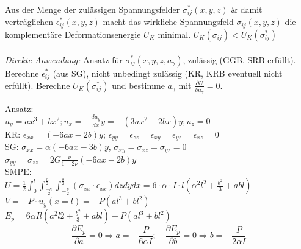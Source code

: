 \documentclass[a4paper,10pt]{article}
\begin{document}
\begin{multicols*}{3}
            Aus der Menge der zulässigen Spannungsfelder $\sigma_{ij}^*(x,y,z)$ \& damit verträglichen $\epsilon_{ij}^*(x,y,z)$ macht das wirkliche Spannungsfeld $\sigma_{ij}(x,y,z)$ die komplementäre Deformationsenergie $U_K$ minimal. $U_K(\sigma_{ij}) < U_K(\sigma_{ij}^*)$\\\\
            \textit{Direkte Anwendung:} Ansatz für $\sigma_{ij}^*(x,y,z,a_\gamma)$, zulässig (GGB, SRB erfüllt). Berechne $\epsilon_{ij}^*$ (aus SG), nicht unbedingt zulässig (KR, KRB eventuell nicht erfüllt). Berechne $U_K(\sigma_{ij}^*)$ und bestimme $a_\gamma$ mit $\frac{\partial U}{\partial a_\gamma}=0$.
            
            Ansatz:\\
            $u_y=ax^3+bx^2; u_x=-\frac{du_y}{dx}y= -(3ax^2+2bx)y; u_z = 0$\\
            KR: $\epsilon_{xx} =(-6ax-2b)y$; $\epsilon_{yy}=\epsilon_{zz}=\epsilon_{xy}=\epsilon_{yz} = \epsilon_{xz}=0$\\
            SG: $\sigma_{xx} = \alpha(-6ax-3b)y$, $\sigma_{xy}=\sigma_{xz}=\sigma_{yz}=0$\\ $\sigma_{yy}=\sigma_{zz}=2G\frac{\nu}{1-2\nu}(-6ax-2b)y$\\
            SMPE:\\
            $U=\frac{1}{2}\int_0^l\int_\frac{-h}{2}^\frac{h}{2}\int_{-\frac{b}{2}}^\frac{b}{2}(\sigma_{xx}\cdot\epsilon_{xx})dzdydx=6\cdot\alpha\cdot I\cdot l(\alpha^2l^2+\frac{b^2}{3}+abl)$\\
            $V=-P\cdot u_y(x=l)=-P(al^3+bl^2)$\\
            $E_p=6\alpha Il(a^2l2+\frac{b^2}{3}+abl)-P(al^3+bl^2)$
            \[\frac{\partial E_p}{\partial a} = 0 \Rightarrow a=-\frac{P}{6\alpha I};\quad\frac{\partial E_p}{\partial b} = 0 \Rightarrow b=-\frac{P}{2\alpha I}\]
            

\end{multicols*}
\end{document}
